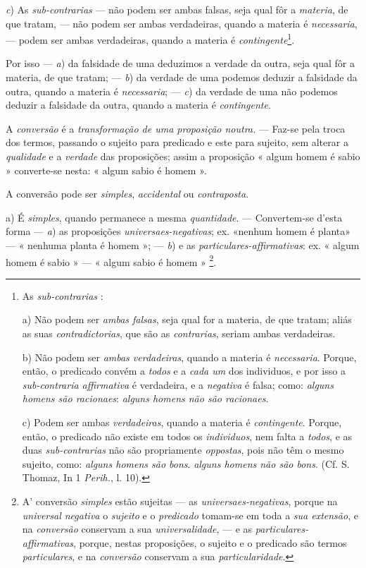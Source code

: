 \emph{c}) As \emph{sub-contrarias} --- não podem ser ambas falsas, seja qual fôr a \emph{materia}, de que tratam, --- não podem ser ambas verdadeiras, quando a materia é \emph{necessaria}, --- podem ser ambas verdadeiras, quando a materia é \emph{contingente}\footnote{As \emph{sub-contrarias} :\par a) Não podem ser \emph{ambas falsas}, seja qual for a materia, de que tratam; aliás as suas \emph{contradictorias}, que são as \emph{contrarias}, seriam ambas verdadeiras.\par b) Não podem ser \emph{ambas verdadeiras}, quando a materia é \emph{necessaria}. Porque, então, o predicado convém a \emph{todos} e a \emph{cada um} dos individuos, e por isso a \emph{sub-contraria affirmativa} é verdadeira, e a \emph{negativa} é falsa; como: \emph{alguns homens são racionaes}: \emph{alguns homens não são racionaes}.\par c) Podem ser ambas \emph{verdadeiras}, quando a materia é \emph{contingente}. Porque, então, o predicado não existe em todos os \emph{individuos}, nem falta a \emph{todos}, e as duas \emph{sub-contrarias} não são propriamente \emph{oppostas}, pois não têm o mesmo sujeito, como: \emph{alguns homens são bons}. \emph{alguns homens não são bons}. (Cf. S. Thomaz, In 1 \emph{Perih.}, l. 10).}.

Por isso --- \emph{a}) da falsidade de uma deduzimos a verdade da outra, seja qual fôr a materia, de que tratam; --- \emph{b}) da verdade de uma podemos deduzir a falsidade da outra, quando a materia é \emph{necessaria}; --- \emph{c}) da verdade de uma não podemos deduzir a falsidade da outra, quando a materia é \emph{contingente}.


A \emph{conversão} é a \emph{transformação de uma proposição noutra.} --- Faz-se pela troca dos termos, passando o sujeito    para predicado e este para sujeito, sem alterar a \emph{qualidade} e a \emph{verdade} das proposições; assim a proposição « algum homem é sabio » converte-se nesta: « algum sabio é homem ».


A conversão pode ser \emph{simples}, \emph{accidental} ou \emph{contraposta}.

a) É \emph{simples}, quando permanece a mesma \emph{quantidade}. --- Convertem-se d'esta forma --- \emph{a}) as proposições \emph{universaes-negativas}; ex. «nenhum homem é planta» --- « nenhuma planta é homem »; --- \emph{b}) e as \emph{particulares-affirmativas}: ex. « algum homem é sabio » --- « algum sabio é homem » \footnote{A' conversão \emph{simples} estão sujeitas --- as \emph{universaes-negativas}, porque na \emph{universal negativa} o \emph{sujeito} e o \emph{predicado} tomam-se em toda a \emph{sua extensão}, e na \emph{conversão} conservam a sua \emph{universalidade}, --- e as \emph{particulares-affirmativas}, porque, nestas proposições, o sujeito e o predicado são termos \emph{particulares}, e na \emph{conversão} conservam a sua \emph{particularidade}.}.

